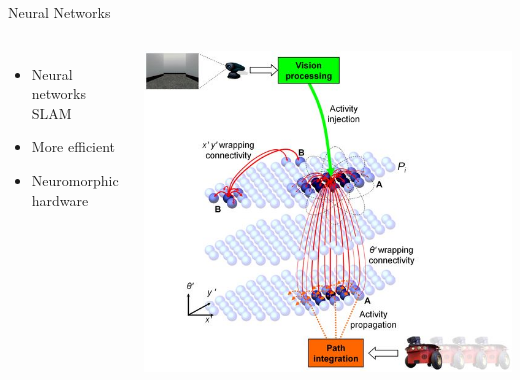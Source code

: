 \documentclass[17pt,mathserif]{beamer}
\begin{document}
    \begin{frame}{Neural Networks}{}
      \vspace*{-3em}        
      \begin{columns}
        \begin{itemize}
          \item Neural networks SLAM\cite{rat-slam}
          \item More efficient
          \item Neuromorphic hardware 
        \end{itemize}
        \hspace*{-1em}
        \vspace*{-1em}
        \includegraphics[width=1.4\textwidth]{ratslam}
      \end{columns}
    \end{frame}
        
\end{document}
